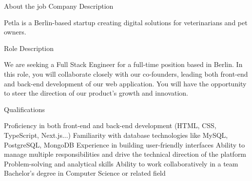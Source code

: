 About the job
Company Description

Petla is a Berlin-based startup creating digital solutions for veterinarians and pet owners.



Role Description

We are seeking a Full Stack Engineer for a full-time position based in Berlin. In this role, you will collaborate closely with our co-founders, leading both front-end and back-end development of our web application. You will have the opportunity to steer the direction of our product's growth and innovation.



Qualifications

Proficiency in both front-end and back-end development (HTML, CSS, TypeScript, Next.js...)
Familiarity with database technologies like MySQL, PostgreSQL, MongoDB
Experience in building user-friendly interfaces
Ability to manage multiple responsibilities and drive the technical direction of the platform
Problem-solving and analytical skills
Ability to work collaboratively in a team
Bachelor's degree in Computer Science or related field


